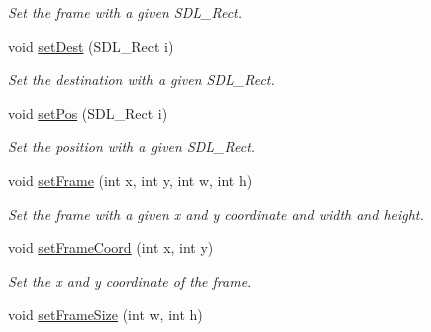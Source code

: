 \begin{DoxyCompactItemize}
\begin{DoxyCompactList}\small\item\em Set the frame with a given S\+D\+L\+\_\+\+Rect. \end{DoxyCompactList}\item 
void \hyperlink{classObject_ae2dc77ca41ab1a49aa15c97539d28f5c}{set\+Dest} (S\+D\+L\+\_\+\+Rect i)\hypertarget{classObject_ae2dc77ca41ab1a49aa15c97539d28f5c}{}\label{classObject_ae2dc77ca41ab1a49aa15c97539d28f5c}

\begin{DoxyCompactList}\small\item\em Set the destination with a given S\+D\+L\+\_\+\+Rect. \end{DoxyCompactList}\item 
void \hyperlink{classObject_adc0bcac930604c018ddf3c0129f50317}{set\+Pos} (S\+D\+L\+\_\+\+Rect i)\hypertarget{classObject_adc0bcac930604c018ddf3c0129f50317}{}\label{classObject_adc0bcac930604c018ddf3c0129f50317}

\begin{DoxyCompactList}\small\item\em Set the position with a given S\+D\+L\+\_\+\+Rect. \end{DoxyCompactList}\item 
void \hyperlink{classObject_a52bedccbb5a658daf8c8ef2abbd5d76e}{set\+Frame} (int x, int y, int w, int h)\hypertarget{classObject_a52bedccbb5a658daf8c8ef2abbd5d76e}{}\label{classObject_a52bedccbb5a658daf8c8ef2abbd5d76e}

\begin{DoxyCompactList}\small\item\em Set the frame with a given x and y coordinate and width and height. \end{DoxyCompactList}\item 
void \hyperlink{classObject_ab2213d14a8983028d49192d49770e0bc}{set\+Frame\+Coord} (int x, int y)\hypertarget{classObject_ab2213d14a8983028d49192d49770e0bc}{}\label{classObject_ab2213d14a8983028d49192d49770e0bc}

\begin{DoxyCompactList}\small\item\em Set the x and y coordinate of the frame. \end{DoxyCompactList}\item 
void \hyperlink{classObject_a2ec266f6f1f6bdc3c3cd001f2dc6daef}{set\+Frame\+Size} (int w, int h)\hypertarget{classObject_a2ec266f6f1f6bdc3c3cd001f2dc6daef}{}\label{classObject_a2ec266f6f1f6bdc3c3cd001f2dc6daef}


\end{DoxyCompactItemize}
